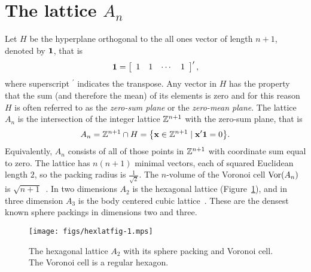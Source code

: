 \documentclass[journal, onecolumn, 11pt]{IEEEtran}
\begin{document}
\section{The lattice $A_n$}\label{sec:lattice-a_n}
Let $H$ be the hyperplane orthogonal to the all ones vector of length $n+1$, denoted by $\boldsymbol{1}$, that is
\[
\boldsymbol{1} = \left[ \begin{array}{cccc} 1 & 1 & \cdots & 1 \end{array} \right]^\prime,
\]
where superscript $^\prime$ indicates the transpose.  Any vector in $H$ has the property that the sum (and therefore the mean) of its elements is zero and for this reason $H$ is often referred to as the \emph{zero-sum plane} or the \emph{zero-mean plane}.
The lattice $A_n$ is the intersection of the integer lattice ${\mathbb Z}^{n+1}$ with the zero-sum plane, that is
\begin{equation}
\label{eq:An_sub_Zn}
  A_{n} = \ints^{n+1} \cap H = \big\{ \xbf \in \ints^{n+1} \mid \dotprod{\xbf}{\onebf} = 0  \big\}.
\end{equation}
Equivalently, $A_n$ consists of all of those points in ${\mathbb Z}^{n+1}$ with coordinate sum equal to zero.
The lattice has $n(n+1)$ minimal vectors, each of squared Euclidean length $2$, so the packing radius is $\frac{1}{\sqrt{2}}$.  The $n$-volume of the Voronoi cell $\operatorname{Vor}(A_n)$ is $\sqrt{n+1}$~\cite[p. 108]{SPLAG}.  In two dimensions $A_2$ is the hexagonal lattice (Figure~\ref{fig:hexlatfig}), and in three dimension $A_3$ is the body centered cubic lattice~\cite[p. 108]{SPLAG}.  These are the densest known sphere packings in dimensions two and three.

\begin{figure}[tbp]
	\centering
		\texttt{[image: figs/hexlatfig-1.mps]}
		\caption{The hexagonal lattice $A_2$ with its sphere packing and Voronoi cell.  The Voronoi cell is a regular hexagon.}
		\label{fig:hexlatfig}
\end{figure}
\end{document}
